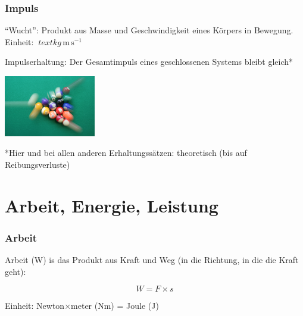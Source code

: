 \documentclass{beamer}
\begin{document}
\begin{frame}
\frametitle{Impuls}

``Wucht'': Produkt aus Masse und Geschwindigkeit eines Körpers in Bewegung. Einheit: \(\
text{kg}\,\text{m}\,\text{s}^{-1}\)

\pause

Impulserhaltung: Der Gesamtimpuls eines geschlossenen Systems bleibt gleich* 

\begin{center}
\includegraphics[width=0.3\textwidth]{billard.jpg}
\end{center}



 *Hier und bei allen anderen  Erhaltungssätzen: theoretisch (bis auf Reibungsverluste)
\end{frame}













\section{Arbeit, Energie, Leistung}


\begin{frame}
\frametitle{Arbeit}

Arbeit (W) is das Produkt aus Kraft und Weg (in die Richtung, in die die Kraft geht):

\[W = F\times s\]

Einheit: Newton\(\times\)meter (Nm) = Joule (J)  

\end{frame}
\end{document}
